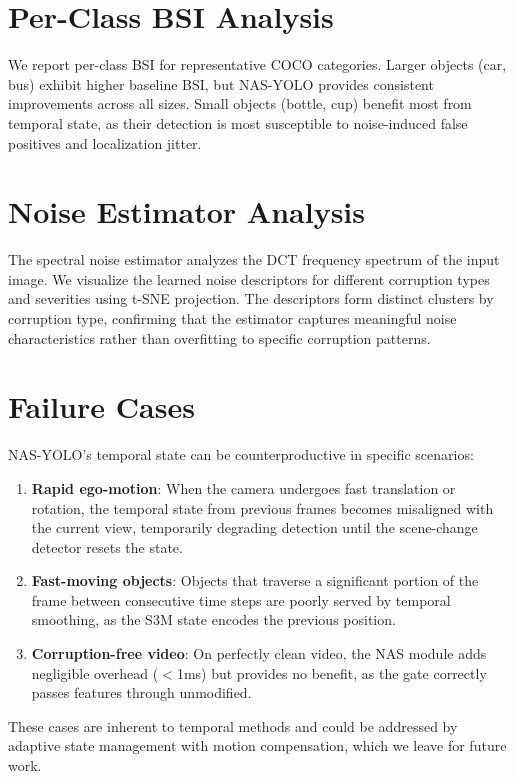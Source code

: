\documentclass[review]{eccv2026}
\begin{document}
\section{Per-Class BSI Analysis}
\label{sec:supp_perclass}

We report per-class BSI for representative COCO categories. Larger objects (car, bus) exhibit higher baseline BSI, but NAS-YOLO provides consistent improvements across all sizes. Small objects (bottle, cup) benefit most from temporal state, as their detection is most susceptible to noise-induced false positives and localization jitter.

\section{Noise Estimator Analysis}
\label{sec:supp_noise}

The spectral noise estimator analyzes the DCT frequency spectrum of the input image. We visualize the learned noise descriptors for different corruption types and severities using t-SNE projection. The descriptors form distinct clusters by corruption type, confirming that the estimator captures meaningful noise characteristics rather than overfitting to specific corruption patterns.

\section{Failure Cases}
\label{sec:supp_failure}

NAS-YOLO's temporal state can be counterproductive in specific scenarios:
\begin{enumerate}
  \item \textbf{Rapid ego-motion}: When the camera undergoes fast translation or rotation, the temporal state from previous frames becomes misaligned with the current view, temporarily degrading detection until the scene-change detector resets the state.
  \item \textbf{Fast-moving objects}: Objects that traverse a significant portion of the frame between consecutive time steps are poorly served by temporal smoothing, as the S3M state encodes the previous position.
  \item \textbf{Corruption-free video}: On perfectly clean video, the NAS module adds negligible overhead ($<$1ms) but provides no benefit, as the gate correctly passes features through unmodified.
\end{enumerate}

These cases are inherent to temporal methods and could be addressed by adaptive state management with motion compensation, which we leave for future work.

{\small


}
\end{document}
